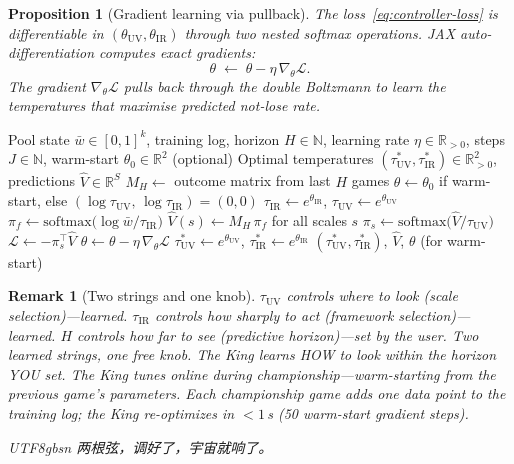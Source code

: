\documentclass[11pt,a4paper]{article}
\newtheorem{proposition}[theorem]{Proposition}
\newtheorem{remark}[theorem]{Remark}
\newcommand{\cL}{\mathcal{L}}
\newcommand{\softmax}{\mathrm{softmax}}
\begin{document}
\begin{proposition}[Gradient learning via pullback]\label{prop:pullback}
The loss~\eqref{eq:controller-loss} is differentiable in
$(\theta_{\mathrm{UV}}, \theta_{\mathrm{IR}})$ through
two nested softmax operations.
JAX auto-differentiation computes exact gradients:
\[
  \theta \;\leftarrow\; \theta - \eta\,\nabla_\theta \cL.
\]
The gradient $\nabla_\theta \cL$ pulls back through
the double Boltzmann to learn the temperatures that
maximise predicted not-lose rate.
\end{proposition}

\begin{algorithm}[ht]
\caption{King's Predictive Control (Phase~2)
  \textup{[Double Boltzmann Temperature Optimization]}}\label{alg:king}
\begin{algorithmic}[1]
\Require Pool state $\bar{w} \in [0,1]^k$, training log,
  horizon $H \in \mathbb{N}$, learning rate $\eta \in \mathbb{R}_{>0}$,
  steps $J \in \mathbb{N}$,
  warm-start $\theta_0 \in \mathbb{R}^2$ (optional)
\Ensure Optimal temperatures
  $(\tau_{\mathrm{UV}}^*, \tau_{\mathrm{IR}}^*) \in \mathbb{R}_{>0}^2$,
  predictions $\hat{V} \in \mathbb{R}^S$
\State $M_H \gets$ outcome matrix from last $H$ games
\State $\theta \gets \theta_0$ if warm-start,
  else $(\log\tau_{\mathrm{UV}},\, \log\tau_{\mathrm{IR}})
  = (0, 0)$
  \State $\tau_{\mathrm{IR}} \gets e^{\theta_{\mathrm{IR}}}$,
    \quad $\tau_{\mathrm{UV}} \gets e^{\theta_{\mathrm{UV}}}$
  \State $\pi_f \gets
    \softmax\!\bigl(\log \bar{w} / \tau_{\mathrm{IR}}\bigr)$
  \State $\hat{V}(s) \gets M_H \, \pi_f$
    \quad for all scales $s$
  \State $\pi_s \gets
    \softmax\!\bigl(\hat{V} / \tau_{\mathrm{UV}}\bigr)$
  \State $\mathcal{L} \gets -\pi_s^\top \hat{V}$
  \State $\theta \gets \theta - \eta\,\nabla_\theta \mathcal{L}$
\EndFor
\State $\tau_{\mathrm{UV}}^* \gets e^{\theta_{\mathrm{UV}}}$,
  \quad $\tau_{\mathrm{IR}}^* \gets e^{\theta_{\mathrm{IR}}}$
\State \Return
  $(\tau_{\mathrm{UV}}^*, \tau_{\mathrm{IR}}^*)$,
  $\hat{V}$, $\theta$ (for warm-start)
\end{algorithmic}
\end{algorithm}

\begin{remark}[Two strings and one knob]\label{rem:two-strings}
$\tau_{\mathrm{UV}}$ controls \emph{where to look}
(scale selection)---learned.
$\tau_{\mathrm{IR}}$ controls \emph{how sharply to act}
(framework selection)---learned.
$H$ controls \emph{how far to see}
(predictive horizon)---set by the user.
Two learned strings, one free knob.
The King learns HOW to look within the horizon YOU set.
The King tunes online during championship---warm-starting
from the previous game's parameters.
Each championship game adds one data point to the
training log; the King re-optimizes in $< 1$\,s
(50 warm-start gradient steps).
\begin{CJK}{UTF8}{gbsn}
两根弦，调好了，宇宙就响了。
\end{CJK}
\end{remark}
\end{document}
